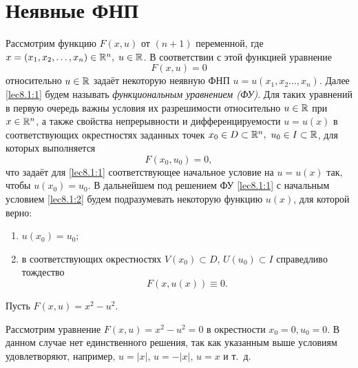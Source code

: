 \documentclass[../../main.tex]{subfiles}
\begin{document}
	\section{Неявные ФНП}

	Рассмотрим функцию $F(x, u)$ от $(n+1)$ переменной, где $x = (x_1, x_2, 
	\ldots,  x_n) \in \mathbb{R}^n, \; u \in \mathbb{R}$. В соответствии с этой функцией уравнение
	 \begin{equation}
		F(x,u) = 0 \label{lec8.1:1}
	 \end{equation}
	 относительно $u \in \mathbb{R}$ задаёт некоторую неявную ФНП $u = u(x_1, x_2 
	 \ldots, x_n)$. Далее \eqref{lec8.1:1} будем называть \emph{функциональным 
	 уравнением (ФУ)}. Для таких уравнений в первую очередь важны условия их 
	 разрешимости относительно $u \in \mathbb{R}$ при $x \in \mathbb{R}^n$, а также свойства 
	 непрерывности и дифференцируемости $u = u(x)$ в соответствующих 
	 окрестностях заданных точек $x_0 \in D \subset \mathbb{R}^n,\ u_0 \in I  \subset \mathbb{R}$, 
	 для которых выполняется
	 \begin{equation}
		F(x_0, u_0) = 0, \label{lec8.1:2}
	 \end{equation}
	 что задаёт для \eqref{lec8.1:1} соответствующее начальное условие на $u = 
	 u(x)$ так, чтобы $u(x_0) = u_0$. В дальнейшем под решением ФУ 
	 \eqref{lec8.1:1} с начальным условием \eqref{lec8.1:2} будем подразумевать 
	 некоторую функцию $u(x)$, для которой верно: 
	 \begin{enumerate}
	 	\item $u(x_0) = u_0$;
	 	\item в соответствующих окрестностях $V(x_0) \subset D$, $U(u_0) 
	 	\subset I$ справедливо тождество
		\begin{equation}
			F(x, u(x)) \equiv 0. \label{lec8.1:3}
		\end{equation}
	 \end{enumerate}
	 \begin{exmp}
		Пусть $F(x, u) = x^2 - u^2$.

		Рассмотрим уравнение $F(x, u) = x^2 - u^2 = 0$ в окрестности $x_0=0, 
		u_0=0$. В данном случае нет единственного решения, так как указанным 
		выше условиям удовлетворяют, например, $u=|x|$, $u=-|x|$, $u = x$  и т.~д.
	 \end{exmp}
\end{document}
